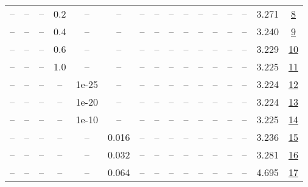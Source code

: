 \begin{table}[H]
\begin{tabular}{cccccccccccccccc}
-- & -- & -- & 0.2 & -- & -- & -- & -- & -- & -- & -- & -- & -- & -- & 3.271 & \href{https://wandb.ai/stanford-mercury/optimizer-scaling/runs/sweep-300m-6B-muon0f2ff2lr0.008-wd0.1-minlr0-warmup0-b10.8-b20.9-ed24ff}{8} \\
-- & -- & -- & 0.4 & -- & -- & -- & -- & -- & -- & -- & -- & -- & -- & 3.240 & \href{https://wandb.ai/stanford-mercury/optimizer-scaling/runs/sweep-300m-6B-muonc2da39lr0.008-wd0.1-minlr0-warmup0-b10.8-b20.9-aa3a76}{9} \\
-- & -- & -- & 0.6 & -- & -- & -- & -- & -- & -- & -- & -- & -- & -- & 3.229 & \href{https://wandb.ai/stanford-mercury/optimizer-scaling/runs/sweep-300m-6B-muon4ce9f6lr0.008-wd0.1-minlr0-warmup0-b10.8-b20.9-073a16}{10} \\
-- & -- & -- & 1.0 & -- & -- & -- & -- & -- & -- & -- & -- & -- & -- & 3.225 & \href{https://wandb.ai/stanford-mercury/optimizer-scaling/runs/sweep-300m-6B-muon202a7elr0.008-wd0.1-minlr0-warmup0-b10.8-b20.9-73a2de}{11} \\
-- & -- & -- & -- & 1e-25 & -- & -- & -- & -- & -- & -- & -- & -- & -- & 3.224 & \href{https://wandb.ai/stanford-mercury/optimizer-scaling/runs/sweep-300m-6B-muone40a7blr0.008-wd0.1-minlr0-warmup0-b10.8-b20.9-033569}{12} \\
-- & -- & -- & -- & 1e-20 & -- & -- & -- & -- & -- & -- & -- & -- & -- & 3.224 & \href{https://wandb.ai/stanford-mercury/optimizer-scaling/runs/sweep-300m-6B-muon77a589lr0.008-wd0.1-minlr0-warmup0-b10.8-b20.9-ccc1c0}{13} \\
-- & -- & -- & -- & 1e-10 & -- & -- & -- & -- & -- & -- & -- & -- & -- & 3.225 & \href{https://wandb.ai/stanford-mercury/optimizer-scaling/runs/sweep-300m-6B-muon7e5c17lr0.008-wd0.1-minlr0-warmup0-b10.8-b20.9-a739dc}{14} \\
-- & -- & -- & -- & -- & 0.016 & -- & -- & -- & -- & -- & -- & -- & -- & 3.236 & \href{https://wandb.ai/stanford-mercury/optimizer-scaling/runs/sweep-300m-6B-muon5f44d2lr0.016-wd0.1-minlr0-warmup0-b10.8-b20.9-e34d49}{15} \\
-- & -- & -- & -- & -- & 0.032 & -- & -- & -- & -- & -- & -- & -- & -- & 3.281 & \href{https://wandb.ai/stanford-mercury/optimizer-scaling/runs/sweep-300m-6B-muond0d176lr0.032-wd0.1-minlr0-warmup0-b10.8-b20.9-6c02c2}{16} \\
-- & -- & -- & -- & -- & 0.064 & -- & -- & -- & -- & -- & -- & -- & -- & 4.695 & \href{https://wandb.ai/stanford-mercury/optimizer-scaling/runs/sweep-300m-6B-muon587e80lr0.064-wd0.1-minlr0-warmup0-b10.8-b20.9-c81b6f}{17} \\

\end{tabular}
\end{table}
